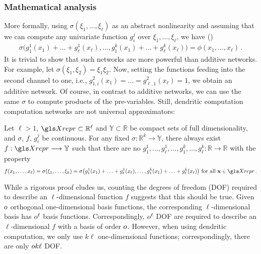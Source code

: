 \subsubsection{Mathematical analysis}
More formally, using $\sigma(\xi_1, \ldots, \xi_\ell)$ as an abstract nonlinearity and assuming that we can compute any univariate function $g_i^j$ over $\xi_1, \ldots, \xi_\ell$, we have ()
\begin{align}
	\sigma \bigl(
		g_{1}^1(x_1) + \ldots + g_{\ell}^1(x_\ell), \ldots, g_{1}^k(x_1) + \ldots + g_{\ell}^k(x_\ell)
	\bigr) = \phi(x_1, \ldots, x_\ell) \,.
	\label{eqn:dendritic_computation_theory}
\end{align}
It is trivial to show that such networks are more powerful than additive networks.
For example, let $\sigma(\xi_1, \xi_2) = \xi_1 \xi_2$.
Now, setting the functions feeding into the second channel to one, i.e., $g_{1, i}^2(x_1) = \ldots = g_{\ell, 1}^2(x_\ell) = 1$, we obtain an additive network.
Of course, in contrast to additive networks, we can use the same $\sigma$ to compute products of the pre-variables.
Still, dendritic computation computation networks are not universal approximators:
\begin{conjecture}
\label{thm:dendritic_compuation_incomplete}
Let $\ell > 1$, $\Xrepr \subset \mathbb{R}^\ell$ and $\mathbb{Y} \subset \mathbb{R}$ be compact sets of full dimensionality, and $\sigma$, $f$, $g^j_i$ be continuous.
For any fixed $\sigma : \mathbb{R}^k \longrightarrow \mathbb{Y}$, there always exist $f : \Xrepr \longrightarrow \mathbb{Y}$ such that there are no $g^1_1, \ldots, g^1_\ell, \ldots, g^k_1, \ldots, g^k_\ell : \mathbb{R}  \longrightarrow \mathbb{R}$ with the property
\begin{align*}
	f(x_1, \ldots, x_\ell) = \sigma(\xi_1, \ldots, \xi_k) = \sigma\bigl( g^1_1(x_1) + \ldots + g^1_\ell(x_\ell), \ldots,  g^k_1(x_1) + \ldots + g^k_\ell(x_\ell)\bigr) \text{ for all } \vec x \in \Xrepr \,.
\end{align*}
\end{conjecture}
\noindent While a rigorous proof eludes us, counting the degrees of freedom (DOF) required to describe an $\ell$-dimensional function $f$ suggests that this should be true.
Given $o$ orthogonal one-dimensional basis functions, the corresponding $\ell$-dimensional basis has $o^\ell$ basis functions.
Correspondingly, $o^\ell$ DOF are required to describe an $\ell$-dimensional $f$ with a basis of order $o$.
However, when using dendritic computation, we only use $k \ell$ one-dimensional functions; correspondingly, there are only $o k \ell$ DOF.
